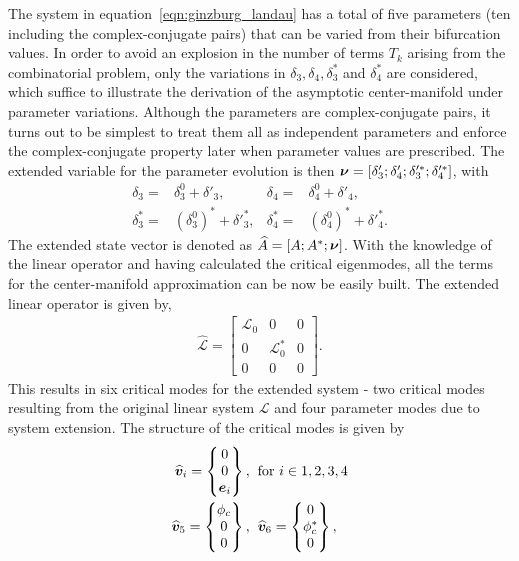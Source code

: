 The system in equation~\eqref{eqn:ginzburg_landau} has a total of five parameters (ten including the complex-conjugate pairs) that can be varied from their bifurcation values. In order to avoid an explosion in the number of terms $T_{k}$ arising from the combinatorial problem, only the variations in $\delta_{3},\delta_{4},\delta^{*}_{3}$ and $\delta^{*}_{4}$ are considered, which suffice to illustrate the derivation of the asymptotic center-manifold under parameter variations. Although the parameters are complex-conjugate pairs, it turns out to be simplest to treat them all as independent parameters and enforce the complex-conjugate property later when parameter values are prescribed. The extended variable for the parameter evolution is then $\boldsymbol{\nu} = [\delta'_{3};\delta'_{4};\delta'^{*}_{3};\delta'^{*}_{4}]$, with 
\begin{align}
	\delta_{3} =& \delta^{0}_{3} + \delta'_{3},& \delta_{4} =& \delta^{0}_{4} + \delta'_{4}, \nonumber \\
	\delta^{*}_{3} =& (\delta^{0}_{3})^{*} + \delta'^{*}_{3}, &\delta^{*}_{4} =& (\delta^{0}_{4})^{*} + \delta'^{*}_{4}. \nonumber
\end{align}
The extended state vector is denoted as $\widehat{A} = [A; A^{*}; \boldsymbol{\nu}]$. With the knowledge of the linear operator and having calculated the critical eigenmodes, all the terms for the center-manifold approximation can be now be easily built. 
The extended linear operator is given by,
 \begin{align}
 	\mathcal{\widehat{L}} = \begin{bmatrix}
 		\mathcal{L}_{0} 	   &	0										&	0 \\
 		0									  & \mathcal{L}^{*}_{0}		&   0 \\
 		0									  & 0											&  0
 	\end{bmatrix}. \nonumber
 \end{align}
This results in six critical modes for the extended system - two critical modes resulting from the original linear system $\mathcal{L}$ and four parameter modes due to system extension. The structure of the critical modes is given by
 \begin{align}
	\widehat{\boldsymbol{v}}_{i} = \begin{Bmatrix}
		0 \\
		0 \\
		\boldsymbol{e}_{i}
	\end{Bmatrix}, & \hspace{2mm} \text{for } i \in 1,2,3,4 \nonumber \\
	\widehat{\boldsymbol{v}}_{5} = \begin{Bmatrix}
		\phi_{c} \\
		0 \\
		0
	\end{Bmatrix}, & \hspace{2mm}
	\widehat{\boldsymbol{v}}_{6} = \begin{Bmatrix}
		0 \\
		\phi^{*}_{c} \\
		0
	\end{Bmatrix}, \nonumber
\end{align}
